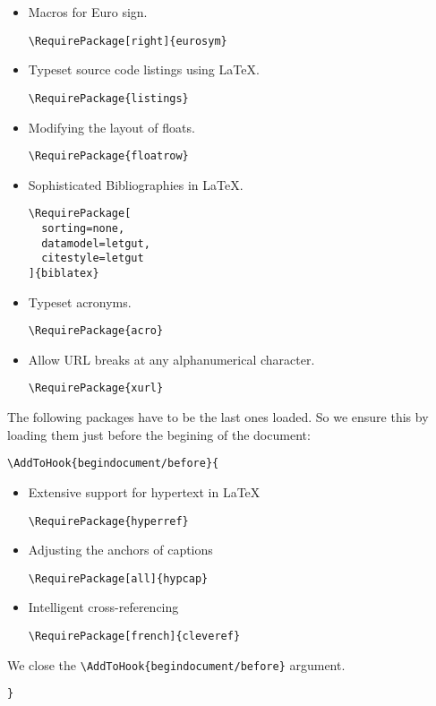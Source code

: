 \documentclass{letgut}
\begin{document}
\begin{itemize}
\begin{lstlisting}
\RequirePackage[nospace,french]{varioref}
\end{lstlisting}
\item Macros for Euro sign.
\begin{lstlisting}
\RequirePackage[right]{eurosym}
\end{lstlisting}
\item Typeset source code listings using \LaTeX{}.
\begin{lstlisting}
\RequirePackage{listings}
\end{lstlisting}
\item Modifying the layout of floats.
\begin{lstlisting}
\RequirePackage{floatrow}
\end{lstlisting}
\item Sophisticated Bibliographies in \LaTeX{}.
\begin{lstlisting}
\RequirePackage[
  sorting=none,
  datamodel=letgut,
  citestyle=letgut
]{biblatex}
\end{lstlisting}
\item Typeset acronyms.
\begin{lstlisting}
\RequirePackage{acro}
\end{lstlisting}
\item Allow URL breaks at any alphanumerical character.
\begin{lstlisting}
\RequirePackage{xurl}
\end{lstlisting}
\end{itemize}

The following packages have to be the last ones loaded. So we ensure this by
loading them just before the begining of the document:
\begin{lstlisting}
\AddToHook{begindocument/before}{
\end{lstlisting}
\begin{itemize}
\item Extensive support for hypertext in \LaTeX{}
\begin{lstlisting}
\RequirePackage{hyperref}
\end{lstlisting}
\item Adjusting the anchors of captions
\begin{lstlisting}
\RequirePackage[all]{hypcap}
\end{lstlisting}
\item Intelligent cross-referencing
\begin{lstlisting}
\RequirePackage[french]{cleveref}
\end{lstlisting}
\end{itemize}
We close the \lstinline+\AddToHook{begindocument/before}+ argument.
\begin{lstlisting}
}
\end{lstlisting}
\end{document}
